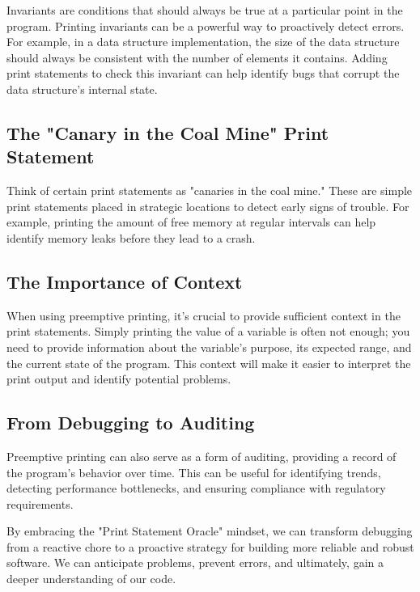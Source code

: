 \documentclass{article}
\begin{document}
{{{{Invariants are conditions that should always be true at a particular point in the program. Printing invariants can be a powerful way to proactively detect errors. For example, in a data structure implementation, the size of the data structure should always be consistent with the number of elements it contains. Adding print statements to check this invariant can help identify bugs that corrupt the data structure's internal state.

\subsection*{The "Canary in the Coal Mine" Print Statement}

Think of certain print statements as "canaries in the coal mine." These are simple print statements placed in strategic locations to detect early signs of trouble. For example, printing the amount of free memory at regular intervals can help identify memory leaks before they lead to a crash.

\subsection*{The Importance of Context}

When using preemptive printing, it's crucial to provide sufficient context in the print statements. Simply printing the value of a variable is often not enough; you need to provide information about the variable's purpose, its expected range, and the current state of the program. This context will make it easier to interpret the print output and identify potential problems.

\subsection*{From Debugging to Auditing}

Preemptive printing can also serve as a form of auditing, providing a record of the program's behavior over time. This can be useful for identifying trends, detecting performance bottlenecks, and ensuring compliance with regulatory requirements.

By embracing the "Print Statement Oracle" mindset, we can transform debugging from a reactive chore to a proactive strategy for building more reliable and robust software. We can anticipate problems, prevent errors, and ultimately, gain a deeper understanding of our code.


}}}}
\end{document}
